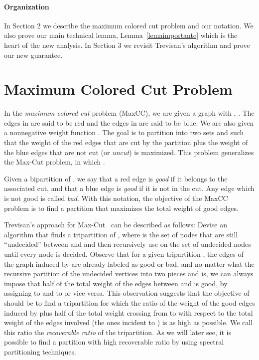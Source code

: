 \documentclass{article}
\theoremstyle{definition}
\theoremstyle{remark}
\numberwithin{equation}{section}
\begin{document}
\paragraph{Organization} In Section 2 we describe the maximum colored cut problem and our notation. We also prove our main technical lemma, 
Lemma~\ref{lemaimportante} which is the heart of the new analysis. In Section 3 we revisit 
Trevisan's algorithm and prove our new guarantee.

\section{Maximum Colored Cut Problem}
In the \emph{maximum colored cut} problem (MaxCC), we are given a graph  with , .
The edges in  are said to be  red and the edges in  are said to be blue. We are also given a nonnegative weight function . The goal is to partition  into two sets  and  such that the weight of the red edges that are cut by the partition plus the weight of the blue edges that are not cut (or \emph{uncut}) is maximized. This problem generalizes the Max-Cut problem, in which .

Given a bipartition of , we say that a red edge is \emph{good} if it belongs to the associated cut, and that a blue edge is \emph{good} if it is 
not in the cut. Any edge which is not good is called \emph{bad}. With this notation, the objective of the MaxCC problem is to find a partition 
that maximizes the total weight of good edges.

Trevisan's approach for Max-Cut~\cite{Luca} can be described as follows: Devise an algorithm  that finds a tripartition  of , 
where  is the set of nodes that are still ``undecided'' between  and  and then recursively use  on the set of undecided nodes until 
every node is decided. Observe that for a given tripartition , the edges of the graph induced by  are already labeled as 
good or bad, and no matter what the recursive partition of the undecided vertices into two pieces  and  is, we can always impose that half of 
the total weight of the edges between  and  is good, by assigning  to  and  to  or vice versa. This 
observation suggests that the objective of  should be to find a tripartition for which the ratio of the weight of the good edges induced by  plus half of the total weight crossing from  to  with respect to the total weight of the edges involved (the ones 
incident to ) is as high as possible. We call this ratio the \emph{recoverable ratio} of the tripartition. As we will later see, it is 
possible to find a partition with high recoverable ratio by using spectral partitioning techniques.
\end{document}
